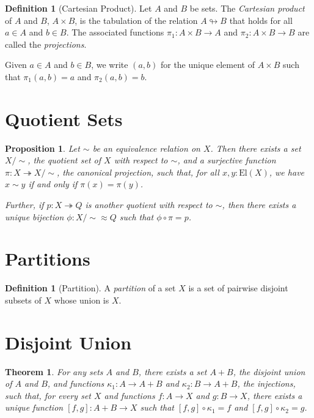 \documentclass{book}
\newtheorem{prop}[ax]{Proposition}
\newtheorem{thm}[ax]{Theorem}
\theoremstyle{definition}
\newtheorem{df}[ax]{Definition}
\newcommand{\El}[1]{\ensuremath{\mathrm{El} \left( {#1} \right)}}
\begin{document}
\begin{df}[Cartesian Product]
Let $A$ and $B$ be sets. The \emph{Cartesian product} of $A$ and $B$, $A \times B$, is the tabulation of the relation $A \looparrowright B$ that holds for all $a \in A$ and $b \in B$. The associated functions $\pi_1 : A \times B \rightarrow A$ and $\pi_2 : A \times B \rightarrow B$ are called the \emph{projections}.

Given $a \in A$ and $b \in B$, we write $(a,b)$ for the unique element of $A \times B$ such that $\pi_1(a,b) = a$ and $\pi_2(a,b) = b$.
\end{df}

\section{Quotient Sets}

\begin{prop}
Let $\sim$ be an equivalence relation on $X$. Then there exists a set $X/\sim$, the \emph{quotient set} of $X$ with respect to $\sim$, and a surjective function $\pi : X \twoheadrightarrow X / \sim$, the \emph{canonical projection}, such that, for all $x,y : \El{X}$, we have $x \sim y$ if and only if $\pi(x) = \pi(y)$.

Further, if $p : X \twoheadrightarrow Q$ is another quotient with respect to $\sim$, then there exists a unique bijection $\phi : X / \sim \approx Q$ such that $\phi \circ \pi = p$.
\end{prop}

\section{Partitions}

\begin{df}[Partition]
A \emph{partition} of a set $X$ is a set of pairwise disjoint subsets of $X$ whose union is $X$.
\end{df}

\section{Disjoint Union}

\begin{thm}
For any sets $A$ and $B$, there exists a set $A + B$, the \emph{disjoint union} of $A$ and $B$, and functions $\kappa_1 : A \rightarrow A + B$ and $\kappa_2 : B \rightarrow A + B$, the \emph{injections}, such that, for every set $X$ and functions $f : A \rightarrow X$ and $g : B \rightarrow X$, there exists a unique function $[f,g] : A + B \rightarrow X$ such that $[f,g] \circ \kappa_1 = f$ and $[f,g] \circ \kappa_2 = g$.
\end{thm}
\end{document}
